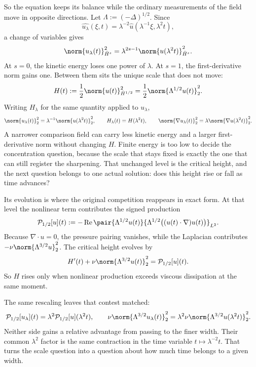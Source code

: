 So the equation keeps its balance while the ordinary measurements of the field move in opposite directions. Let \(\Lambda:=(-\Delta)^{1/2}\). Since
\[
  \widehat{u_\lambda}(\xi,t)
  =
  \lambda^{-2}\widehat u(\lambda^{-1}\xi,\lambda^2t),
\]
a change of variables gives
\[
  \norm{u_\lambda(t)}_{\dot H^s}^2
  =
  \lambda^{2s-1}
  \norm{u(\lambda^2t)}_{\dot H^s}^2.
\]
At \(s=0\), the kinetic energy loses one power of \(\lambda\). At \(s=1\), the first-derivative norm gains one. Between them sits the unique scale that does not move:
\[
  H(t)
  :=
  \frac12\norm{u(t)}_{\dot H^{1/2}}^2
  =
  \frac12\norm{\Lambda^{1/2}u(t)}_2^2.
\]
Writing \(H_\lambda\) for the same quantity applied to \(u_\lambda\),
\[
  \norm{u_\lambda(t)}_2^2
  =
  \lambda^{-1}\norm{u(\lambda^2t)}_2^2,
  \qquad
  H_\lambda(t)=H(\lambda^2t),
  \qquad
  \norm{\nabla u_\lambda(t)}_2^2
  =
  \lambda\norm{\nabla u(\lambda^2t)}_2^2.
\]
A narrower comparison field can carry less kinetic energy and a larger first-derivative norm without changing \(H\). Finite energy is too low to decide the concentration question, because the scale that stays fixed is exactly the one that can still register the sharpening. That unchanged level is the critical height, and the next question belongs to one actual solution: does this height rise or fall as time advances?


Its evolution is where the original competition reappears in exact form. At that level the nonlinear term contributes the signed production
\[
  \mathcal P_{1/2}[u](t)
  :=
  -\operatorname{Re}
  \pair
    {\Lambda^{1/2}u(t)}
    {\Lambda^{1/2}\bigl((u(t)\cdot\nabla)u(t)\bigr)}_{L^2}.
\]
Because \(\nabla\cdot u=0\), the pressure pairing vanishes, while the Laplacian contributes \(-\nu\norm{\Lambda^{3/2}u}_2^2\). The critical height evolves by
\[
  H'(t)
  +
  \nu\norm{\Lambda^{3/2}u(t)}_2^2
  =
  \mathcal P_{1/2}[u](t).
\]
So \(H\) rises only when nonlinear production exceeds viscous dissipation at the same moment.

The same rescaling leaves that contest matched:
\[
  \mathcal P_{1/2}[u_\lambda](t)
  =
  \lambda^2\mathcal P_{1/2}[u](\lambda^2t),
  \qquad
  \nu\norm{\Lambda^{3/2}u_\lambda(t)}_2^2
  =
  \lambda^2\nu\norm{\Lambda^{3/2}u(\lambda^2t)}_2^2.
\]
Neither side gains a relative advantage from passing to the finer width. Their common \(\lambda^2\) factor is the same contraction in the time variable \(t\mapsto\lambda^{-2}t\). That turns the scale question into a question about how much time belongs to a given width.

